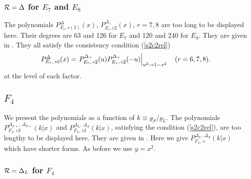 \documentclass[a4paper,12pt]{article}
\newcommand{\vT}{\vphantom{\mbox{\twozero I}}}
\begin{document}
\subsubsection{${\cal R}={\Delta}$ for $E_7$ and $E_8$}

The polynomials $P_{E_r,s(2)}^{\Delta}(x)$, $P_{E_r,c2}^{\Delta_+}(x)$,
$r=7,8$ are too long to be displayed here.
Their degrees are 63 and 126 for $E_7$ and 120 and 240 for $E_8$.
They are given in \cite{poly}. They all satisfy the consistency condition
(\ref{s2c2rel})
\begin{equation}
   P_{E_r,\,s2}^{{\Delta}}(x)=
   \left.\vT P_{E_r,\,c2}^{{\Delta}_+}(u)P_{E_r,\,c2}^{{\Delta}_+}(-u)
   \right|_{u^2\to1-x^2}\quad (r=6,7,8).
\end{equation}
at the level of each factor.

\subsection{$F_4$}

We present the polynomials as a function of $k\equiv g_S/g_L$.
The polynomials $P_{F_4,\,c2}^{\Delta_{L+},\,\Delta_{S+}}(k|x)$ and
$P_{F_4,\,s2}^{\Delta_{L},\,\Delta_{S}}(k|x)$, satisfying the condition
(\ref{s2c2rel}), are too lengthy to be displayed here.
They are given in \cite{poly}.
Here we give $P_{F_4,\,s}^{\Delta_{L},\,\Delta_{S}}(k|x)$ which have shorter
forms. As before we use $y=x^2$.

\subsubsection{${\cal R}=\Delta_L$ for $F_4$}
\end{document}
